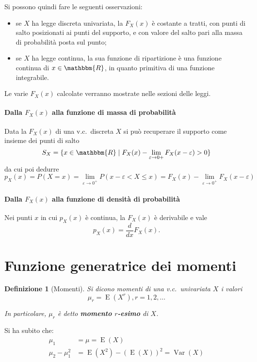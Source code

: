 \documentclass[11pt,a4paper,twoside]{article}
\newtheorem{definition}{Definizione}
\let\epsilon\varepsilon%
\let\leq\leqslant%
\newcommand\R{\mathbbm{R}}
\DeclareMathOperator{\Var}{Var}
\DeclareMathOperator{\E}{E}
\begin{document}
Si possono quindi fare le seguenti osservazioni:
\begin{itemize}
\item se \(X\) ha legge discreta univariata, la \(F_X(x)\) è costante
  a tratti, con punti di salto posizionati ai punti del supporto, e
  con valore del salto pari alla massa di probabilità posta sul punto;
\item se \(X\) ha legge continua, la sua funzione di ripartizione è
  una funzione continua di \(x\in\R\), in quanto primitiva di una
  funzione integrabile.
\end{itemize}

Le varie \(F_X(x)\) calcolate verranno mostrate nelle sezioni delle
leggi.

\paragraph{Dalla \(F_X(x)\) alla funzione di massa di probabilità}
Data la \(F_X(x)\) di una v.c.\ discreta \(X\) si può recuperare il
supporto come insieme dei punti di salto
\[
  S_X = \{ x\in\R \mid F_X(x) - \lim_{\epsilon\to 0+}F_X(x-\epsilon)>0 \}
\]
da cui poi dedurre
\[
  p_X(x) = P(X = x) = \lim_{\epsilon\to 0^+} P(x-\epsilon < X \leq x)
  = F_X(x) - \lim_{\epsilon\to 0^+} F_X(x-\epsilon)
\]

\paragraph{Dalla \(F_X(x)\) alla funzione di densità di probabilità}
Nei punti \(x\) in cui \(p_X(x)\) è continua, la \(F_X(x)\) è
derivabile e vale
\[
  p_X(x) = \frac{d}{dx}F_X(x).
\]

\section{Funzione generatrice dei momenti}
\begin{definition}[Momenti]
  Si dicono momenti di una v.c.\ univariata \(X\) i valori
  \[
    \mu_r = \E(X^r), r = 1, 2, \dots
  \]

  In particolare, \(\mu_r\) è detto \textbf{momento \(r\)-esimo} di \(X\).
\end{definition}

Si ha subito che:
\begin{align*}
  \mu_1 &= \mu = \E(X) \\
  \mu_2 - \mu_1^2 &= \E(X^2)- \left( \E(X) \right)^2 = \Var(X)
\end{align*}
\end{document}

